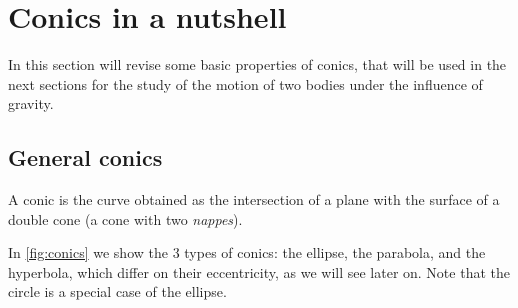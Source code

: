 \documentclass[../main.tex]{subfiles}
\begin{document}
\section{Conics in a nutshell}
In this section will revise some basic properties of conics, that will be used in the next sections for the study of the motion of two bodies under the influence of gravity.
\subsection{General conics}
\begin{definition}
  A conic is the curve obtained as the intersection of a plane with the surface of a double cone (a cone with two \emph{nappes}).
\end{definition}
In \cref{fig:conics} we show the 3 types of conics: the ellipse, the parabola, and the hyperbola, which differ on their eccentricity, as we will see later on. Note that the circle is a special case of the ellipse.
\end{document}
